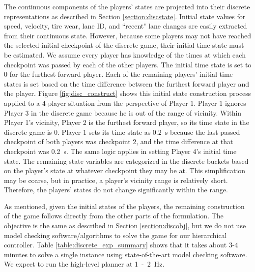 The continuous components of the players' states are projected into their discrete representations as described in Section \ref{section:discstate}. Initial state values for speed, velocity, tire wear, lane ID, and ``recent" lane changes are easily extracted from their continuous state. However, because some players may not have reached the selected initial checkpoint of the discrete game, their initial time state must be estimated. We assume every player has knowledge of the times at which each checkpoint was passed by each of the other players. The initial time state is set to 0 for the furthest forward player. Each of the remaining players' initial time states is set based on the time difference between the furthest forward player and the player. Figure \ref{fig:disc_construct} shows this initial state construction process applied to a 4-player situation from the perspective of Player 1. Player 1 ignores Player 3 in the discrete game because he is out of the range of vicinity. Within Player 1's vicinity, Player 2 is the furthest forward player, so its time state in the discrete game is 0. Player 1 sets its time state as \SI{0.2}{\second} because the last passed checkpoint of both players was checkpoint 2, and the time difference at that checkpoint was \SI{0.2}{\second}. The same logic applies in setting Player 4's initial time state. The remaining state variables are categorized in the discrete buckets based on the player's state at whatever checkpoint they may be at. This simplification may be coarse, but in practice, a player's vicinity range is relatively short. Therefore, the players' states do not change significantly within the range.

As mentioned, given the initial states of the players, the remaining construction of the game follows directly from the other parts of the formulation. The objective is the same as described in Section \ref{section:discobj}, but we do not use model checking software/algorithms to solve the game for our hierarchical controller. Table \ref{table:discrete_exp_summary} shows that it takes about 3-4 minutes to solve a single instance using state-of-the-art model checking software. We expect to run the high-level planner at \SI{1}-\SI{2}{\hertz}.

